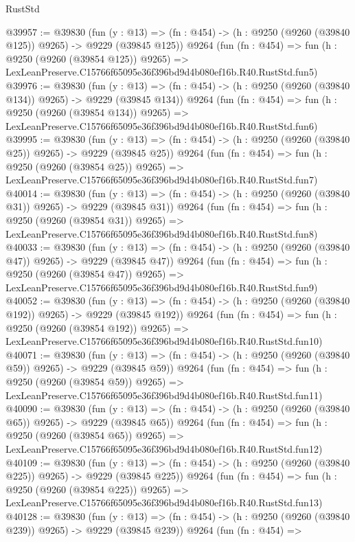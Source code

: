 \begin{lexlean}{RustStd}
\begin{coremodule}
@39957 := @39830
    (fun (y : @13) => (fn : @454) -> (h : @9250 (@9260 (@39840 @125)) @9265) -> @9229 (@39845 @125))
    @9264
    (fun (fn : @454) =>
    fun (h : @9250 (@9260 (@39854 @125)) @9265) =>
    LexLeanPreserve.C15766f65095e36f396bd9d4b080ef16b.R40.RustStd.fun5)
@39976 := @39830
    (fun (y : @13) => (fn : @454) -> (h : @9250 (@9260 (@39840 @134)) @9265) -> @9229 (@39845 @134))
    @9264
    (fun (fn : @454) =>
    fun (h : @9250 (@9260 (@39854 @134)) @9265) =>
    LexLeanPreserve.C15766f65095e36f396bd9d4b080ef16b.R40.RustStd.fun6)
@39995 := @39830
    (fun (y : @13) => (fn : @454) -> (h : @9250 (@9260 (@39840 @25)) @9265) -> @9229 (@39845 @25))
    @9264
    (fun (fn : @454) =>
    fun (h : @9250 (@9260 (@39854 @25)) @9265) =>
    LexLeanPreserve.C15766f65095e36f396bd9d4b080ef16b.R40.RustStd.fun7)
@40014 := @39830
    (fun (y : @13) => (fn : @454) -> (h : @9250 (@9260 (@39840 @31)) @9265) -> @9229 (@39845 @31))
    @9264
    (fun (fn : @454) =>
    fun (h : @9250 (@9260 (@39854 @31)) @9265) =>
    LexLeanPreserve.C15766f65095e36f396bd9d4b080ef16b.R40.RustStd.fun8)
@40033 := @39830
    (fun (y : @13) => (fn : @454) -> (h : @9250 (@9260 (@39840 @47)) @9265) -> @9229 (@39845 @47))
    @9264
    (fun (fn : @454) =>
    fun (h : @9250 (@9260 (@39854 @47)) @9265) =>
    LexLeanPreserve.C15766f65095e36f396bd9d4b080ef16b.R40.RustStd.fun9)
@40052 := @39830
    (fun (y : @13) => (fn : @454) -> (h : @9250 (@9260 (@39840 @192)) @9265) -> @9229 (@39845 @192))
    @9264
    (fun (fn : @454) =>
    fun (h : @9250 (@9260 (@39854 @192)) @9265) =>
    LexLeanPreserve.C15766f65095e36f396bd9d4b080ef16b.R40.RustStd.fun10)
@40071 := @39830
    (fun (y : @13) => (fn : @454) -> (h : @9250 (@9260 (@39840 @59)) @9265) -> @9229 (@39845 @59))
    @9264
    (fun (fn : @454) =>
    fun (h : @9250 (@9260 (@39854 @59)) @9265) =>
    LexLeanPreserve.C15766f65095e36f396bd9d4b080ef16b.R40.RustStd.fun11)
@40090 := @39830
    (fun (y : @13) => (fn : @454) -> (h : @9250 (@9260 (@39840 @65)) @9265) -> @9229 (@39845 @65))
    @9264
    (fun (fn : @454) =>
    fun (h : @9250 (@9260 (@39854 @65)) @9265) =>
    LexLeanPreserve.C15766f65095e36f396bd9d4b080ef16b.R40.RustStd.fun12)
@40109 := @39830
    (fun (y : @13) => (fn : @454) -> (h : @9250 (@9260 (@39840 @225)) @9265) -> @9229 (@39845 @225))
    @9264
    (fun (fn : @454) =>
    fun (h : @9250 (@9260 (@39854 @225)) @9265) =>
    LexLeanPreserve.C15766f65095e36f396bd9d4b080ef16b.R40.RustStd.fun13)
@40128 := @39830
    (fun (y : @13) => (fn : @454) -> (h : @9250 (@9260 (@39840 @239)) @9265) -> @9229 (@39845 @239))
    @9264
    (fun (fn : @454) =>

\end{coremodule}
\end{lexlean}
